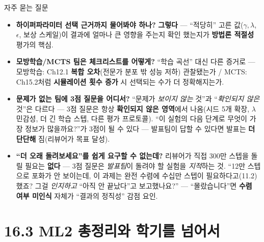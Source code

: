 \documentclass[aspectratio=169,11pt]{beamer}
\begin{document}
\begin{frame}{자주 묻는 질문}
  \small
  \begin{itemize}
    \item \textbf{하이퍼파라미터 선택 근거까지 물어봐야 하나?}
      \textbf{그렇다} — ``적당히'' 고른 값($\gamma, \lambda$,
      $\epsilon$, 보상 스케일)이 결과에 얼마나 큰 영향을 주는지 확인
      했는지가 \textbf{방법론 적절성} 평가의 핵심.
    \item \textbf{모방학습/MCTS 팀은 체크리스트를 어떻게?} ``학습
      곡선'' 대신 다른 증거로 — 모방학습: Ch12.1 \textbf{복합
      오차}(전문가 분포 밖 성능 저하) 관찰됐는가 / MCTS: Ch15.2처럼
      \textbf{시뮬레이션 횟수 증가} 시 선택되는 수가 더 정확해지는가.
    \item \textbf{문제가 없는 팀에 3점 질문을 어디서?} ``문제가
      \emph{보이지 않는} 것''과 ``\emph{확인되지 않은} 것''은 다르다 —
      3점 질문은 항상 \textbf{확인되지 않은 영역}에서 나옴(시드 5개
      확장, $\lambda$ 민감성, 더 긴 학습 스텝, 다른 평가 프로토콜).
      ``이 실험의 다음 단계로 무엇이 가장 정보가 많을까요?''가 3점이
      될 수 있다 — 발표팀이 답할 수 있다면 발표는 \textbf{더 단단해}
      짐(리뷰어가 목표 달성).
    \item \textbf{``더 오래 돌려보세요''를 쉽게 요구할 수 없는데?}
      리뷰어가 직접 300만 스텝을 돌릴 필요는 \textbf{없다} — 3점
      질문은 \emph{발표팀}이 돌려야 할 실험을 \emph{지적}하는 것.
      ``12만 스텝으로 포화가 안 보이는데, 이 과제는 완전 수렴에 수십만
      스텝이 필요하다고(11.2) 했죠? 그걸 \emph{인지하고} ``아직
      안 끝났다''고 보고했나요?'' — ``몰랐습니다''면 \textbf{수렴
      여부 미인식} 자체가 ``결과의 정직성'' 감점 요인.
  \end{itemize}
\end{frame}

\section{16.3 ML2 총정리와 학기를 넘어서}

\end{document}
